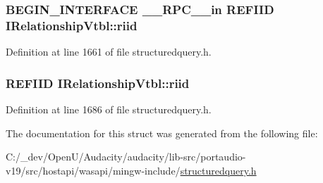 \subsubsection[{\texorpdfstring{riid}{riid}}]{\setlength{\rightskip}{0pt plus 5cm}B\+E\+G\+I\+N\+\_\+\+I\+N\+T\+E\+R\+F\+A\+CE {\bf \+\_\+\+\_\+\+R\+P\+C\+\_\+\+\_\+in} {\bf R\+E\+F\+I\+ID} I\+Relationship\+Vtbl\+::riid}\hypertarget{struct_i_relationship_vtbl_a9be27328fbd02cda1564ce200c7fe5ea}{}\label{struct_i_relationship_vtbl_a9be27328fbd02cda1564ce200c7fe5ea}


Definition at line 1661 of file structuredquery.\+h.

\subsubsection[{\texorpdfstring{riid}{riid}}]{ {\bf R\+E\+F\+I\+ID} I\+Relationship\+Vtbl\+::riid}\hypertarget{struct_i_relationship_vtbl_a7d2a5578ff5bed3286887c4654fd527e}{}\label{struct_i_relationship_vtbl_a7d2a5578ff5bed3286887c4654fd527e}


Definition at line 1686 of file structuredquery.\+h.



The documentation for this struct was generated from the following file\+:\begin{DoxyCompactItemize}
\item 
C\+:/\+\_\+dev/\+Open\+U/\+Audacity/audacity/lib-\/src/portaudio-\/v19/src/hostapi/wasapi/mingw-\/include/\hyperlink{structuredquery_8h}{structuredquery.\+h}\end{DoxyCompactItemize}
